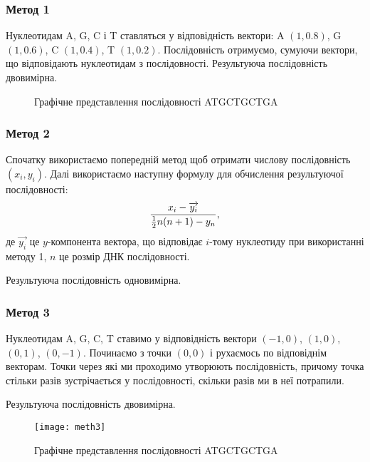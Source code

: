 \documentclass[mathserif,serif,10pt]{beamer}
\begin{document}
\begin{frame}
 \frametitle{Метод 1}
Нуклеотидам A, G, C і T ставляться у відповідність вектори: A $(1,0.8)$, G $(1,0.6)$, C $(1,0.4)$, T $(1,0.2)$.
Послідовність отримуємо, сумуючи вектори, що відповідають нуклеотидам з послідовності. Результуюча послідовність двовимірна.
\begin{figure}
\begin{center}
\end{center}
\caption{Графічне представлення послідовності ATGCTGCTGA}
\label{fig:1}
\end{figure}
\end{frame}

\begin{frame}
\frametitle{Метод 2}
Спочатку використаємо попередній метод щоб отримати числову послідовність $(x_i,y_i)$. Далі використаємо наступну формулу для обчислення результуючої послідовності:
\[{x_i-\overrightarrow{y_i} \over{{1\over2}n(n+1)-y_n}},\]
де $\overrightarrow{y_i}$ це $y$-компонента вектора, що відповідає $i$-тому нуклеотиду при використанні методу 1, $n$ це розмір ДНК послідовності.
\par
Результуюча послідовність одновимірна.
\end{frame}

\begin{frame}
\frametitle{Метод 3}
Нуклеотидам A, G, C, T ставимо у відповідність вектори $(-1,0)$, $(1,0)$,
$(0,1)$, $(0,-1)$. Починаємо з точки $(0,0)$ і рухаємось по відповіднім
векторам. Точки через які ми проходимо утворюють послідовність, причому точка
стільки разів зустрічається у послідовності, скільки разів ми в неї потрапили. \par
Результуюча послідовність двовимірна.
\begin{figure}[h!]
\centering
\texttt{[image: meth3]}
\caption{Графічне представлення послідовності ATGCTGCTGA}
\end{figure}
\end{frame}
\end{document}
